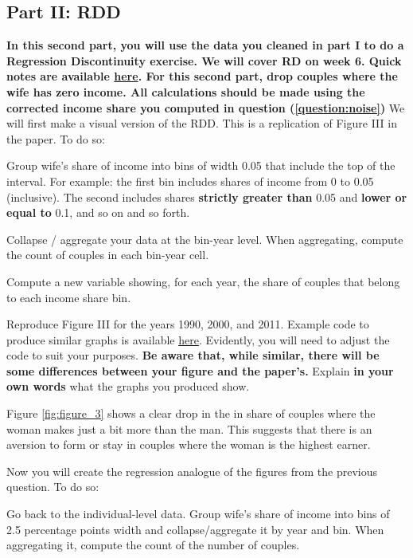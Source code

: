 \documentclass[a4paper, 11pt,addpoints]{exam}
\begin{document}
\begin{questions}
\section*{Part II: RDD}
\noindent \textbf{In this second part, you will use the data you cleaned in part I to do a Regression Discontinuity exercise. We will cover RD on week 6. Quick notes are available \href{https://cesarlgm.github.io/documents/teaching/labour_documents/rdd_notes.pdf}{here}. \newline \newline For this second part, drop couples where the wife has zero income. All calculations should be made using the corrected income share you computed  in question (\ref{question:noise})}
\question[15] We will first make a visual version of the RDD. This is a replication of Figure III in the paper. To do so:
\bitem 
\item Group wife's share of income into bins of width 0.05 that include the top of the interval. For example: the first bin includes shares of income from 0 to 0.05 (inclusive). The second includes shares \textbf{strictly greater than} 0.05 and \textbf{lower or equal to} 0.1, and so on and so forth.
\item Collapse / aggregate your data at the bin-year level. When aggregating, compute the count of couples in each bin-year cell.
\item Compute a new variable showing, for each year, the share of couples that belong to each income share bin.
\item Reproduce Figure III for the years 1990, 2000, and 2011. Example code to produce similar graphs is available \href{https://cesarlgm.github.io/documents/teaching/labour_documents/code_example_lowess.pdf}{here}. Evidently, you will need to adjust the code to suit your purposes. \textbf{Be aware that, while similar, there will be some differences between your figure and the paper's.}
\eitem 
Explain \textbf{in your own words} what the graphs you produced show.
\begin{solution}
	Figure \ref{fig:figure_3} shows  a clear drop in the in share of couples where the woman makes just a bit more than the man. This suggests that there is an aversion to form or stay in couples where the woman is the highest earner.
	
\end{solution}
\question[20] Now you will create the regression analogue of the figures from the previous question. To do so:
\label{eq:reg_table}
\bitem 
	\item Go back to the individual-level data. Group wife's share of income into bins of 2.5 percentage points width and collapse/aggregate it by year and bin. When aggregating it, compute the count of the number of couples.

\end{questions}
\end{document}
